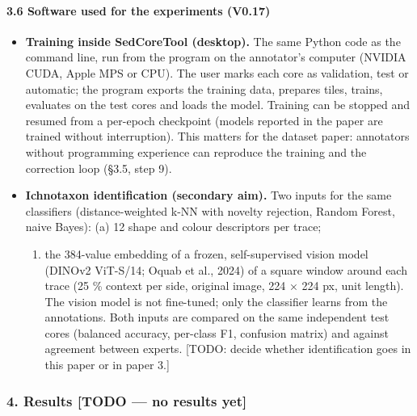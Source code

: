 \documentclass[
  10pt,
]{article}
\providecommand{\tightlist}{%
  \setlength{\itemsep}{0pt}\setlength{\parskip}{0pt}}
\begin{document}
\hypertarget{software-used-for-the-experiments-v0.17}{%
\paragraph{3.6 Software used for the experiments
(V0.17)}\label{software-used-for-the-experiments-v0.17}}

\begin{itemize}
\tightlist
\item
  \textbf{Training inside SedCoreTool (desktop).} The same Python code
  as the command line, run from the program on the annotator's computer
  (NVIDIA CUDA, Apple MPS or CPU). The user marks each core as
  validation, test or automatic; the program exports the training data,
  prepares tiles, trains, evaluates on the test cores and loads the
  model. Training can be stopped and resumed from a per-epoch checkpoint
  (models reported in the paper are trained without interruption). This
  matters for the dataset paper: annotators without programming
  experience can reproduce the training and the correction loop (§3.5,
  step 9).
\item
  \textbf{Ichnotaxon identification (secondary aim).} Two inputs for the
  same classifiers (distance-weighted k-NN with novelty rejection,
  Random Forest, naive Bayes): (a) 12 shape and colour descriptors per
  trace;

  \begin{enumerate}
  \def\labelenumi{(\alph{enumi})}
  \setcounter{enumi}{1}
  \tightlist
  \item
    the 384-value embedding of a frozen, self-supervised vision model
    (DINOv2 ViT-S/14; Oquab et al., 2024) of a square window around each
    trace (25 \% context per side, original image, 224 × 224 px, unit
    length). The vision model is not fine-tuned; only the classifier
    learns from the annotations. Both inputs are compared on the same
    independent test cores (balanced accuracy, per-class F1, confusion
    matrix) and against agreement between experts. {[}TODO: decide
    whether identification goes in this paper or in paper 3.{]}
  \end{enumerate}
\end{itemize}

\hypertarget{results-todo-no-results-yet}{%
\subsubsection{4. Results {[}TODO --- no results
yet{]}}\label{results-todo-no-results-yet}}
\end{document}
